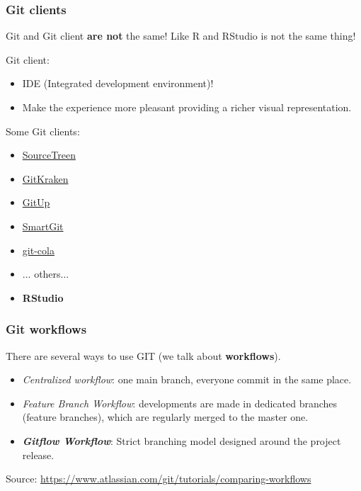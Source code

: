 \documentclass[svgnames]{beamer}
\begin{document}
\begin{frame}
    \frametitle{Git clients}

    Git and Git client \textbf{are not} the same! Like R and RStudio is not the same thing!
    \hfill \break

    Git client:
    \begin{itemize}
        \item IDE (Integrated development environment)!
        \item Make the experience more pleasant providing a richer visual representation.
    \end{itemize}

    \hfill 

    Some Git clients:
    \begin{itemize}
        \item \href{https://www.sourcetreeapp.com/}{\faStar SourceTreen} 
        \item \href{https://www.gitkraken.com/}{\faStar GitKraken}
        \item \href{https://gitup.co/}{\faStar GitUp} 
        \item \href{https://www.syntevo.com/smartgit/}{\faStar SmartGit} 
        \item \href{https://git-cola.github.io/}{\faStar git-cola} 
        \item ... others... 
        \item \textbf{RStudio} 
    \end{itemize}
\end{frame}


\begin{frame}
    \frametitle{Git workflows} %
    There are several ways to use GIT (we talk about \textbf{workflows}). 

    \begin{itemize}
        \item \emph{Centralized workflow}: one main branch, everyone commit in the same place.
        \item \emph{Feature Branch Workflow}: developments are made in dedicated branches (feature branches), which are regularly merged to the master one.
        \item \textbf{\textit{Gitflow Workflow}}: Strict branching model designed around the project release.
    \end{itemize}

    Source: \url{https://www.atlassian.com/git/tutorials/comparing-workflows}

\end{frame}
\end{document}
